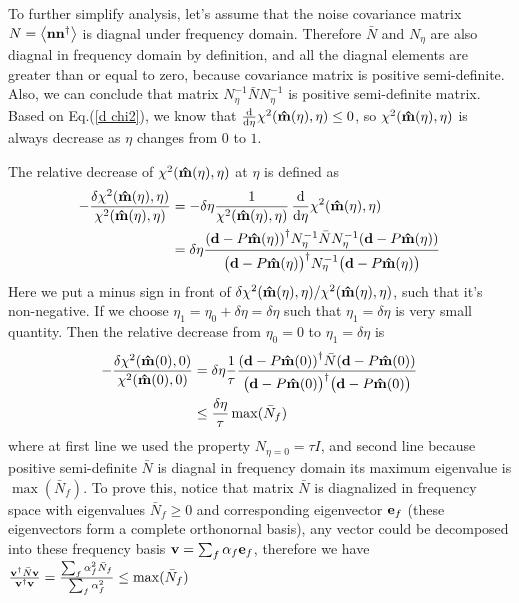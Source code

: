 \documentclass[11pt, letterpaper]{article}
\newcommand{\vbd}{\vb{d}}
\newcommand{\vbn}{\vb{n}}
\newcommand{\inv}[1]{#1^{-1}}
\newcommand{\hatm}{\vb{\hat{m}}}
\newcommand{\Nbar}{\bar{N}}
\newcommand{\Neta}{N_{\eta}}
\begin{document}
To further simplify analysis, let's assume that the noise covariance matrix
$N = \ev{\vbn\vbn^{\dagger}}$ is diagnal under frequency domain.
Therefore $\Nbar$ and $\Neta$ are also diagnal in frequency domain by
definition, and all the diagnal elements are greater than or equal to zero,
because covariance matrix is positive semi-definite.
Also, we can conclude that matrix
$\inv{\Neta} \Nbar \inv{\Neta}$ is positive semi-definite matrix.
Based on Eq.(\ref{d chi2}), we know that
$\dv{\eta} \chi^2({\hatm(\eta), \eta}) \leq 0$,
so $\chi^2(\hatm(\eta), \eta)$ is always decrease
as $\eta$ changes from $0$ to $1$.

The relative decrease of $\chi^2(\hatm(\eta), \eta)$ at $\eta$ is defined as
\begin{align}
\begin{aligned}[b]
-\frac{\delta \chi^2(\hatm(\eta),\eta)} {\chi^2(\hatm(\eta), \eta)}
&=
-\delta \eta \frac{1}{\chi^2(\hatm(\eta), \eta)} \, 
\dv{\eta} \chi^2(\hatm(\eta), \eta) 
\\&= 
\delta \eta 
\frac{\qty(\vbd - P\hatm(\eta))^{\dagger}
    \inv{\Neta} \Nbar \inv{\Neta}
    (\vbd - P\hatm(\eta)) 
}
{\qty\big(\vbd - P \hatm(\eta))^{\dagger} 
    \inv{\Neta}
    \qty\big(\vbd - P\hatm(\eta))
}
\end{aligned}
\end{align}
Here we put a minus sign in front of
$\delta\chi^2(\hatm(\eta), \eta)/\chi^2(\hatm(\eta), \eta)$,
such that it's non-negative.
If we choose $\eta_1 = \eta_0 + \delta\eta = \delta\eta$
such that $\eta_1 = \delta \eta$ is very small quantity.
Then the relative decrease from $\eta_0= 0$ to $\eta_1 = \delta \eta$ is
\begin{align}
\begin{aligned}[b]
-\frac{\delta \chi^2(\hatm(0), 0)}{\chi^2(\hatm(0), 0)} 
&= \delta \eta 
\frac{1}{\tau}
\frac{\qty(\vbd - P\hatm(0))^{\dagger} \Nbar  (\vbd - P\hatm(0)) }
    {\qty\big(\vbd - P \hatm(0))^{\dagger} \qty\big(\vbd - P\hatm(0))}
\\
& \leq  \frac{\delta \eta}{\tau} \max(\Nbar_f)
\end{aligned}
\end{align}
where at first line we used the property $N_{\eta=0} = \tau I$,
and second line because positive semi-definite $\Nbar$ is diagnal in frequency 
domain its maximum eigenvalue is $\max(\Nbar_f)$.
To prove this, notice that matrix $\Nbar$ is diagnalized in frequency space 
with eigenvalues $\Nbar_f\geq0$ and corresponding eigenvector $\vb{e}_f$
(these eigenvectors form a complete orthonornal basis),
any vector could be decomposed into these frequency basis
$\vb{v} = \sum_f \alpha_f \vb{e}_f$, therefore we have
$\frac{\vb{v}^{\dagger} \Nbar \vb{v}}{\vb{v}^{\dagger} \vb{v}} 
= \frac{\sum_f \alpha_f^2\Nbar_f}{\sum_f \alpha_f^2}
\leq \max(\Nbar_f) $
\end{document}
